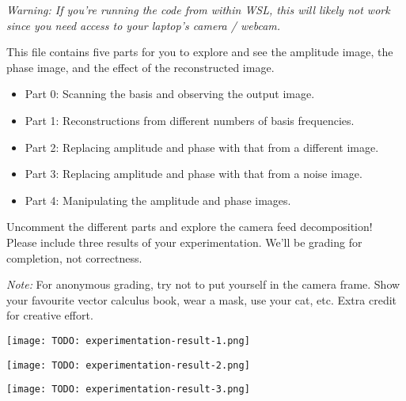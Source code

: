 \textit{Warning: If you're running the code from within WSL, this will likely not work since you need access to your laptop's camera / webcam.}

This file contains five parts for you to explore and see the amplitude image, the phase image, and the effect of the reconstructed image.
\begin{itemize}
    \item Part 0: Scanning the basis and observing the output image.
    \item Part 1: Reconstructions from different numbers of basis frequencies.
    \item Part 2: Replacing amplitude and phase with that from a different image.
    \item Part 3: Replacing amplitude and phase with that from a noise image.
    \item Part 4: Manipulating the amplitude and phase images.
\end{itemize}

Uncomment the different parts and explore the camera feed decomposition! Please include three results of your experimentation. We'll be grading for completion, not correctness.

\emph{Note:} For anonymous grading, try not to put yourself in the camera frame. Show your favourite vector calculus book, wear a mask, use your cat, etc. Extra credit for creative effort.

\texttt{[image: TODO: experimentation-result-1.png]}

\texttt{[image: TODO: experimentation-result-2.png]}

\texttt{[image: TODO: experimentation-result-3.png]}










\pagebreak

